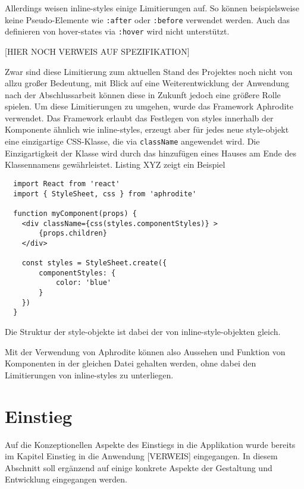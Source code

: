 Allerdings weisen inline-styles einige Limitierungen auf. So können beispielsweise keine Pseudo-Elemente wie \verb|:after| oder \verb|:before| verwendet werden. Auch das definieren von hover-states via \verb|:hover| wird nicht unterstützt.

[HIER NOCH VERWEIS AUF SPEZIFIKATION]

Zwar sind diese Limitierung zum aktuellen Stand des Projektes noch nicht von allzu großer Bedeutung, mit Blick auf eine Weiterentwicklung der Anwendung nach der Abschlussarbeit können diese in Zukunft jedoch eine größere Rolle spielen.
Um diese  Limitierungen zu umgehen, wurde das Framework Aphrodite verwendet. Das Framework erlaubt das Festlegen von styles innerhalb der Komponente ähnlich wie inline-styles, erzeugt aber für jedes neue style-objekt eine einzigartige CSS-Klasse, die via \verb|className| angewendet wird. Die Einzigartigkeit der Klasse wird durch das hinzufügen eines Hauses am Ende des Klassennamens gewährleistet.  Listing XYZ zeigt ein Beispiel

\begin{lstlisting}
  import React from 'react'
  import { StyleSheet, css } from 'aphrodite'

  function myComponent(props) {
  	<div className={css(styles.componentStyles)} >
  		{props.children}
  	</div>

  	const styles = StyleSheet.create({
  		componentStyles: {
  			color: 'blue'
  		}
  	})
  }
\end{lstlisting}

Die Struktur der style-objekte ist dabei der von inline-style-objekten gleich.

Mit der Verwendung von Aphrodite können also Aussehen und Funktion von Komponenten in der gleichen Datei gehalten werden, ohne dabei den Limitierungen von inline-styles zu unterliegen.

\section{Einstieg}
Auf die Konzeptionellen Aspekte des Einstiegs in die Applikation wurde bereits im Kapitel Einstieg in die Anwendung [VERWEIS] eingegangen. In diesem Abschnitt soll ergänzend  auf einige konkrete Aspekte der Gestaltung und Entwicklung eingegangen werden.

